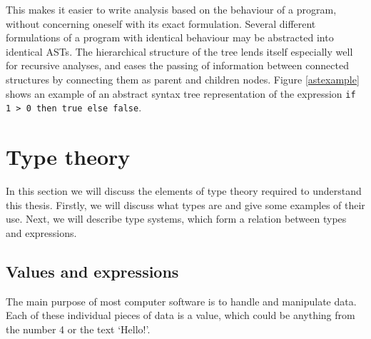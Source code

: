\documentclass[nofilelist]{cslthse-msc}
\newcommand{\CR}[1]{\textcolor{green!60!black}{[\textbf{CR}:#1]}}
\newcommand{\reviewquestion}[1]{\textcolor{red!80!black}{[\textbf{Review question}:#1]}}
\begin{document}
This makes it easier to write analysis based on the behaviour of a program, without concerning oneself with its exact formulation.
Several different formulations of a program with identical behaviour may be abstracted into identical ASTs.
The hierarchical structure of the tree lends itself especially well for recursive analyses, and eases the passing of information between connected structures by connecting them as parent and children nodes.
Figure \ref{astexample} shows an example of an abstract syntax tree representation of the expression \verb|if 1 > 0 then true else false|.


\section{Type theory}\label{typetheory}
In this section we will discuss the elements of type theory required to understand this thesis.
Firstly, we will discuss what types are and give some examples of their use.
Next, we will describe type systems, which form a relation between types and expressions.

\subsection{Values and expressions}
The main purpose of most computer software is to handle and manipulate data.
Each of these individual pieces of data is a value, which could be anything from the number 4 or the text `Hello!'.
\end{document}
